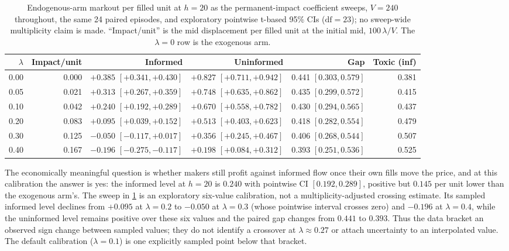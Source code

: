 \begin{table}[t]
\centering
\caption{Endogenous-arm markout per filled unit at $h = 20$ as the permanent-impact coefficient sweeps, $V = 240$ throughout, the same 24 paired episodes, and exploratory pointwise t-based 95\% CIs ($\mathrm{df}=23$); no sweep-wide multiplicity claim is made. ``Impact/unit'' is the mid displacement per filled unit at the initial mid, $100\,\lambda/V$. The $\lambda = 0$ row is the exogenous arm.}
\label{tab:f6-endo-sweep}
\footnotesize
\setlength{\tabcolsep}{3.5pt}
\begin{tabular}{rrrrrr}
\toprule
$\lambda$ & Impact/unit & Informed & Uninformed & Gap & Toxic (inf) \\
\midrule
0.00 & 0.000 & $+0.385$ $[+0.341, +0.430]$ & $+0.827$ $[+0.711, +0.942]$ & 0.441 $[0.303, 0.579]$ & 0.381 \\
0.05 & 0.021 & $+0.313$ $[+0.267, +0.359]$ & $+0.748$ $[+0.635, +0.862]$ & 0.435 $[0.299, 0.572]$ & 0.415 \\
0.10 & 0.042 & $+0.240$ $[+0.192, +0.289]$ & $+0.670$ $[+0.558, +0.782]$ & 0.430 $[0.294, 0.565]$ & 0.437 \\
0.20 & 0.083 & $+0.095$ $[+0.039, +0.152]$ & $+0.513$ $[+0.403, +0.623]$ & 0.418 $[0.282, 0.554]$ & 0.479 \\
0.30 & 0.125 & $-0.050$ $[-0.117, +0.017]$ & $+0.356$ $[+0.245, +0.467]$ & 0.406 $[0.268, 0.544]$ & 0.507 \\
0.40 & 0.167 & $-0.196$ $[-0.275, -0.117]$ & $+0.198$ $[+0.084, +0.312]$ & 0.393 $[0.251, 0.536]$ & 0.525 \\
\bottomrule
\end{tabular}
\end{table}

The economically meaningful question is whether makers still profit against informed flow once their own fills move the price, and at this calibration the answer is yes: the informed level at $h = 20$ is $0.240$ with pointwise CI $[0.192, 0.289]$, positive but $0.145$ per unit lower than the exogenous arm's. The sweep in \cref{tab:f6-endo-sweep} is an exploratory six-value calibration, not a multiplicity-adjusted crossing estimate. Its sampled informed level declines from $+0.095$ at $\lambda=0.2$ to $-0.050$ at $\lambda=0.3$ (whose pointwise interval crosses zero) and $-0.196$ at $\lambda=0.4$, while the uninformed level remains positive over these six values and the paired gap changes from $0.441$ to $0.393$. Thus the data bracket an observed sign change between sampled values; they do not identify a crossover at $\lambda\approx0.27$ or attach uncertainty to an interpolated value. The default calibration ($\lambda=0.1$) is one explicitly sampled point below that bracket.

